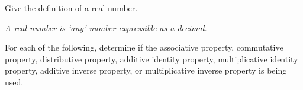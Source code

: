 \documentclass[11pt,letterpaper]{article}
\begin{document}

 Give the definition of a real number. \pvspace{1cm}

{\itshape A real number is `any' number expressible as a decimal.}





\vfill





 For each of the following, determine if the associative property, commutative property, distributive property, additive identity property, multiplicative identity property, additive inverse property, or multiplicative inverse property is being used. \pvspace{0.2cm}
\end{document}
